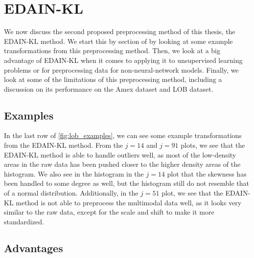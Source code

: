 \documentclass{statsmsc}
\begin{document}
{%

\section{EDAIN-KL}%
\label{sec:EDAIN-KL-discuss}


We now discuss the second proposed preprocessing method of this thesis, the \ac{EDAIN-KL} method.
We start this by section of by looking at some example transformations from this
preprocessing method. Then, we look at a big advantage of \ac{EDAIN-KL} when it comes to applying
it to unsupervised learning problems or for preprocessing data for non-neural-network models.
Finally, we look at some of the limitations of this preprocessing method, including a discussion
on its performance on the Amex dataset and \ac{LOB} dataset.

\subsection{Examples}%
\label{sub:Examples}

In the last row of \cref{fig:lob_examples}, we can see some example transformations from the
\ac{EDAIN-KL} method.
From the $j=14$ and $j=91$ plots, we see that the \ac{EDAIN-KL} method is able to handle outliers
well, as most of the low-density areas in the raw data has been pushed closer to the higher
density areas of the histogram. We also see in the histogram in the $j=14$ plot that
the skewness has been handled to some degree as well, but the histogram still do not resemble that
of a normal distribution. Additionally, in the $j=51$ plot, we see that the \ac{EDAIN-KL} method
is not able to preprocess the multimodal data well, as it looks very similar to the raw data,
except for the scale and shift to make it more standardized.

\subsection{Advantages}%
\label{sub:edain_kl_advantages}

}
\end{document}
